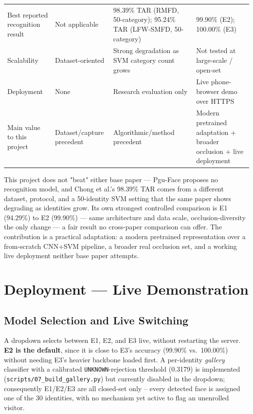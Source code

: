 \documentclass[11pt]{article}
\begin{document}
\begin{longtable}{L{2.6cm}L{3.6cm}L{3.9cm}L{4.1cm}}
Best reported recognition result & Not applicable & 98.39\% TAR (RMFD, 50-category); 95.24\% TAR (LFW-SMFD, 50-category) & 99.90\% (E2); 100.00\% (E3) \\
Scalability & Dataset-oriented & Strong degradation as SVM category count grows & Not tested at large-scale / open-set \\
Deployment & None & Research evaluation only & Live phone-browser demo over HTTPS \\
Main value to this project & Dataset/capture precedent & Algorithmic/method precedent & Modern pretrained adaptation + broader occlusion + live deployment \\
\bottomrule
\end{longtable}

This project does not "beat" either base paper — Pgu-Face proposes no recognition model, and Chong et al.'s 98.39\% TAR comes from a different dataset, protocol, and a 50-identity SVM setting that the same paper shows degrading as identities grow. Its own strongest controlled comparison is E1 (94.29\%) to E2 (99.90\%) — same architecture and data scale, occlusion-diversity the only change — a fair result no cross-paper comparison can offer. The contribution is a practical adaptation: a modern pretrained representation over a from-scratch CNN+SVM pipeline, a broader real occlusion set, and a working live deployment neither base paper attempts.

\section{Deployment — Live Demonstration}
\label{sec:deployment}

\subsection{Model Selection and Live Switching}

A dropdown selects between E1, E2, and E3 live, without restarting the server. \textbf{E2 is the default}, since it is close to E3's accuracy (99.90\% vs.\ 100.00\%) without needing E3's heavier backbone loaded first. A per-identity \emph{gallery} classifier with a calibrated \texttt{UNKNOWN}-rejection threshold (0.3179) is implemented (\texttt{scripts/07\_build\_gallery.py}) but currently disabled in the dropdown; consequently E1/E2/E3 are all closed-set only -- every detected face is assigned one of the 30 identities, with no mechanism yet active to flag an unenrolled visitor.
\end{document}
